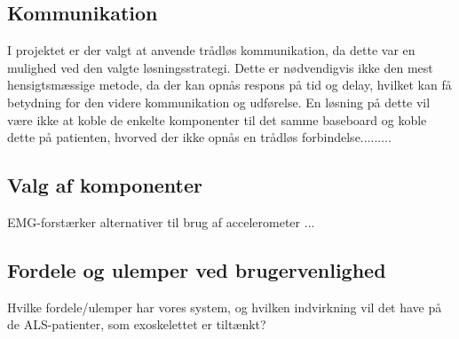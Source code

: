 \subsection{Kommunikation}
I projektet er der valgt at anvende trådløs kommunikation, da dette var en mulighed ved den valgte løsningsstrategi. Dette er nødvendigvis ikke den mest hensigtsmæssige metode, da der kan opnås respons på tid og delay, hvilket kan få betydning for den videre kommunikation og udførelse. En løsning på dette vil være ikke at koble de enkelte komponenter til det samme baseboard og koble dette på patienten, hvorved der ikke opnås en trådløs forbindelse.........


\subsection{Valg af komponenter}
EMG-forstærker alternativer til brug af accelerometer ... 

\subsection{Fordele og ulemper ved brugervenlighed}
Hvilke fordele/ulemper har vores system, og hvilken indvirkning vil det have på de ALS-patienter, som exoskelettet er tiltænkt?

